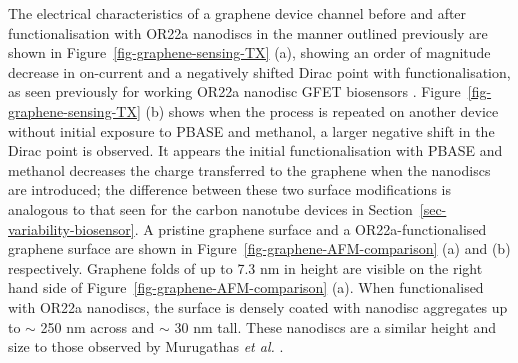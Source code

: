 \documentclass[
  a4paper,
]{scrbook}
\begin{document}
The electrical characteristics of a graphene device channel before and
after functionalisation with OR22a nanodiscs in the manner outlined
previously are shown in Figure~\ref{fig-graphene-sensing-TX} (a),
showing an order of magnitude decrease in on-current and a negatively
shifted Dirac point with functionalisation, as seen previously for
working OR22a nanodisc GFET biosensors \autocite{Murugathas2020}.
Figure~\ref{fig-graphene-sensing-TX} (b) shows when the process is
repeated on another device without initial exposure to PBASE and
methanol, a larger negative shift in the Dirac point is observed. It
appears the initial functionalisation with PBASE and methanol decreases
the charge transferred to the graphene when the nanodiscs are
introduced; the difference between these two surface modifications is
analogous to that seen for the carbon nanotube devices in
Section~\ref{sec-variability-biosensor}. A pristine graphene surface and
a OR22a-functionalised graphene surface are shown in
Figure~\ref{fig-graphene-AFM-comparison} (a) and (b) respectively.
Graphene folds of up to 7.3 nm in height are visible on the right hand
side of Figure~\ref{fig-graphene-AFM-comparison} (a). When
functionalised with OR22a nanodiscs, the surface is densely coated with
nanodisc aggregates up to \(\sim\) 250 nm across and \(\sim\) 30 nm
tall. These nanodiscs are a similar height and size to those observed by
Murugathas \emph{et al.} \autocite{Murugathas2020}.
\end{document}
